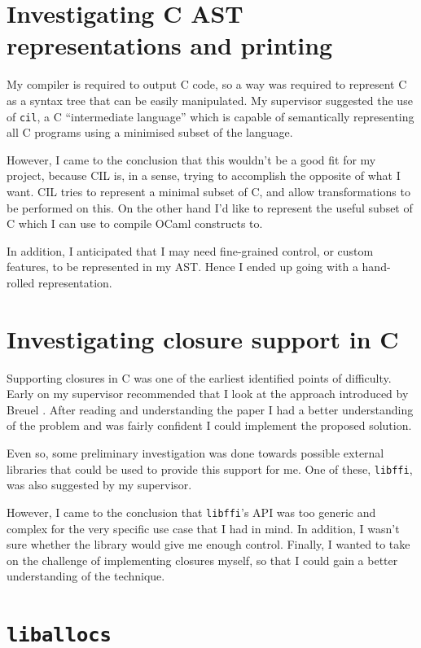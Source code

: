 \documentclass[12pt,a4paper,twoside,openright]{report}
\begin{document}
\section{Investigating C AST representations and printing}

My compiler is required to output C code, so a way was required to represent C
as a syntax tree that can be easily manipulated. My supervisor suggested the
use of \lstinline!cil!, a C ``intermediate language'' which is capable of
semantically representing all C programs using a minimised subset of the language.

However, I came to the conclusion that this wouldn't be a good fit for my project, because
 CIL is, in a sense, trying to accomplish the opposite of what I want. CIL
 tries to represent a minimal subset of C, and allow transformations to be
 performed on this. On the other hand I'd like to represent the useful subset
 of C which I can use to compile OCaml constructs to.

In addition, I anticipated that I may need fine-grained control, or custom
features, to be represented in my AST. Hence I ended up going with a hand-rolled
representation.


\section{Investigating closure support in C}

Supporting closures in C was one of the earliest identified points of difficulty.
Early on my supervisor recommended that I look at the approach introduced by
Breuel \cite{breuel88}. After reading and understanding the paper I had a
better understanding of the problem and was fairly confident I could implement
the proposed solution.

Even so, some preliminary investigation was done towards possible external
libraries that could be used to provide this support for me. One of these,
\lstinline!libffi!, was also suggested by my supervisor.

However, I came to the conclusion that \lstinline!libffi!'s API was too generic
and complex for the very specific use case that I had in mind. In addition, I
wasn't sure whether the library would give me enough control. Finally, I wanted
to take on the challenge of implementing closures myself, so that I could gain
a better understanding of the technique.

\section{\texttt{liballocs}}
\end{document}
